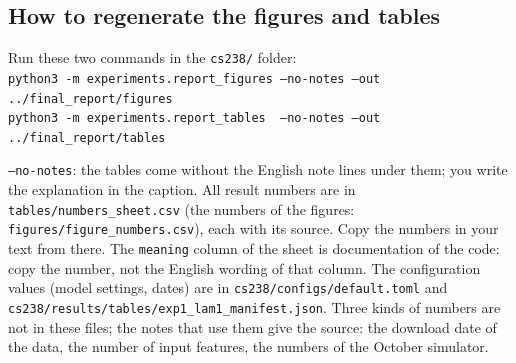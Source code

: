 \documentclass{article}
\begin{document}
\subsection*{How to regenerate the figures and tables}
Run these two commands in the \texttt{cs238/} folder:\\
{\footnotesize\texttt{python3 -m experiments.report\_figures --no-notes --out ../final\_report/figures}\\
\texttt{python3 -m experiments.report\_tables\ \ --no-notes --out ../final\_report/tables}}\\[2pt]
{\raggedright \texttt{--no-notes}: the tables come without the English note lines under them; you write the explanation in the caption. All result numbers are in \texttt{tables/numbers\_sheet.csv} (the numbers of the figures: \texttt{figures/figure\_numbers.csv}), each with its source. Copy the numbers in your text from there. The \texttt{meaning} column of the sheet is documentation of the code: copy the number, not the English wording of that column. The configuration values (model settings, dates) are in \texttt{cs238/configs/default.toml} and \texttt{cs238/results/tables/exp1\_lam1\_manifest.json}. Three kinds of numbers are not in these files; the notes that use them give the source: the download date of the data, the number of input features, the numbers of the October simulator.\par}
\endgroup
\clearpage
\pagestyle{plain}
\setcounter{page}{1}
\fi

\maketitle
\suppressfloats[t]   %
\end{document}
